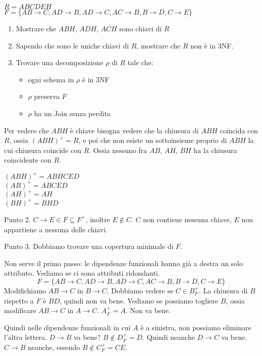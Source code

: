 \begin{exmp}
$R = ABCDEH$ \\
$F = \{ AB \to C, AD \to B, AD \to C, AC \to B, B \to D, C \to E \}$

\begin{enumerate}
    \item Mostrare che $ABH$, $ADH$, $ACH$ sono chiavi di $R$
    \item Sapendo che sono le uniche chiavi di $R$, mostrare che $R$ non \`e in 3NF.
    \item Trovare una decomposizione $\rho$ di $R$ tale che:
    \begin{itemize}
        \item ogni schema in $\rho$ \`e in 3NF
        \item $\rho$ preserva $F$
        \item $\rho$ ha un Join senza perdita
    \end{itemize}
\end{enumerate}

Per vedere che $ABH$ \`e chiave bisogna vedere che la chiusura di $ABH$ coincida con $R$, ossia $(ABH)^+ = R$, e poi che non esiste un sottoinsieme proprio di $ABH$ la cui chiusura coincide con $R$. Ossia nessuno fra $AB$, $AH$, $BH$ ha la chiusura coincidente con $R$.

$(ABH)^+ = ABHCED$ \\
$(AB)^+ = ABCED$ \\
$(AH)^+ = AH$ \\
$(BH)^+ = BHD$

Punto 2. $C \to E \in F \subseteq F^+$, inoltre $E \notin C$. $C$ non contiene nessuna chiave, $E$ non appartiene a nessuna delle chiavi.

Punto 3. Dobbiamo trovare una copertura minimale di $F$.

Non serve il primo passo: le dipendenze funzionali hanno gi\`a a destra un solo attributo. Vediamo se ci sono attributi ridondanti.
\[
F = \{ AB \to C, AD \to B, AD \to C, AC \to B, B \to D, C \to E \}
\]
Modifichiamo $AB \to C$ in $B \to C$. Dobbiamo vedere se $C \in B^+_F$. La chiusura di $B$ rispetto a $F$ \`e $BD$, quindi non va bene. Vediamo se possiamo togliere $B$, ossia modificare $AB \to C$ in $A \to C$. $A^+_F = A$. Non va bene.

Quindi nelle dipendenze funzionali in cui $A$ \`e a sinistra, non possiamo eliminare l'altra lettera. $D \to B$ va bene? $B \notin D^+_F = D$. Quindi neanche $D \to C$ va bene. $C \to B$ neanche, essendo $B \notin C^+_F = CE$. 


\end{exmp}
